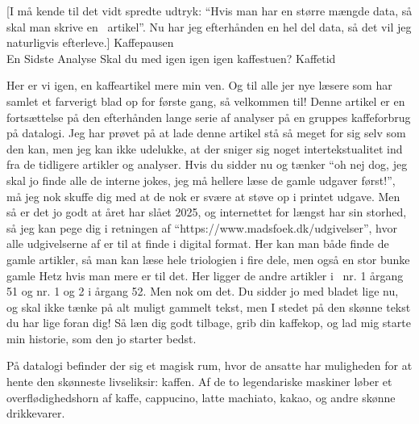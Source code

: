 \begin{article}
[I må kende til det vidt spredte udtryk: ``Hvis man har en større mængde data, så skal man skrive en \madsfoek\ artikel''. Nu har jeg efterhånden en hel del data, så det vil jeg naturligvis efterleve.]
{Kaffepausen \\ {\large En Sidste Analyse}}
{Skal du med igen igen igen kaffestuen?}
{Kaffetid \protect\coffee\ }

\renewcommand{\figurename}{Figur.}

Her er vi igen, en kaffeartikel mere min ven. Og til alle jer nye læsere som har samlet et farverigt \madsfoek blad op for første gang, så velkommen til!
Denne artikel er en fortsættelse på den efterhånden lange serie af analyser på en gruppes kaffeforbrug på datalogi.
Jeg har prøvet på at lade denne artikel stå så meget for sig selv som den kan, men jeg kan ikke udelukke, at der sniger sig noget intertekstualitet ind fra de tidligere artikler og analyser. Hvis du sidder nu og tænker ``oh nej dog, jeg skal jo finde alle de interne jokes, jeg må hellere læse de gamle udgaver først!'', må jeg nok skuffe dig med at de nok er svære at støve op i printet udgave. Men så er det jo godt at året har slået 2025, og internettet for længst har sin storhed, så jeg kan pege dig i retningen af ``https://www.madsfoek.dk/udgivelser'', hvor alle udgivelserne af \madsfoek er til at finde i digital format. Her kan man både finde de gamle artikler, så man kan læse hele triologien i fire dele, men også en stor bunke gamle Hetz hvis man mere er til det. Her ligger de andre artikler i \madsfoek\ nr. 1 årgang 51 og nr. 1 og 2 i årgang 52.
Men nok om det. Du sidder jo med bladet lige nu, og skal ikke tænke på alt muligt gammelt tekst, men I stedet på den skønne tekst du har lige foran dig! Så læn dig godt tilbage, grib din kaffekop, og lad mig starte min historie, som den jo starter bedst.

På datalogi befinder der sig et magisk rum, hvor de ansatte har muligheden for at hente den skønneste livseliksir: kaffen. Af de to legendariske maskiner løber et overflødighedshorn af kaffe, cappucino, latte machiato, kakao, og andre skønne drikkevarer.


\end{article}
